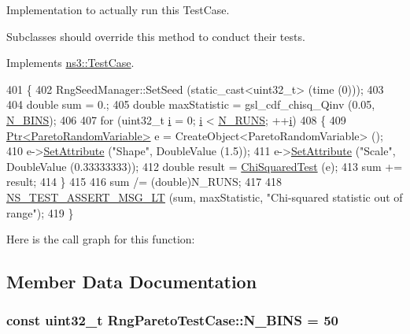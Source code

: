 Implementation to actually run this Test\+Case. 

Subclasses should override this method to conduct their tests. 

Implements \hyperlink{classns3_1_1TestCase_a8ff74680cf017ed42011e4be51917a24}{ns3\+::\+Test\+Case}.


\begin{DoxyCode}
401 \{
402   RngSeedManager::SetSeed (static\_cast<uint32\_t> (time (0)));
403 
404   \textcolor{keywordtype}{double} sum = 0.;
405   \textcolor{keywordtype}{double} maxStatistic = gsl\_cdf\_chisq\_Qinv (0.05, \hyperlink{classRngParetoTestCase_a1f6889d2d2ecb522f62cdf0ddb8a6153}{N\_BINS});
406 
407   \textcolor{keywordflow}{for} (uint32\_t \hyperlink{bernuolliDistribution_8m_a6f6ccfcf58b31cb6412107d9d5281426}{i} = 0; \hyperlink{bernuolliDistribution_8m_a6f6ccfcf58b31cb6412107d9d5281426}{i} < \hyperlink{classRngParetoTestCase_a08aa14adfe517ce6bce686b6a62b9f4b}{N\_RUNS}; ++\hyperlink{bernuolliDistribution_8m_a6f6ccfcf58b31cb6412107d9d5281426}{i})
408     \{
409       \hyperlink{classns3_1_1Ptr}{Ptr<ParetoRandomVariable>} e = CreateObject<ParetoRandomVariable> ();
410       e->\hyperlink{classns3_1_1ObjectBase_ac60245d3ea4123bbc9b1d391f1f6592f}{SetAttribute} (\textcolor{stringliteral}{"Shape"}, DoubleValue (1.5));
411       e->\hyperlink{classns3_1_1ObjectBase_ac60245d3ea4123bbc9b1d391f1f6592f}{SetAttribute} (\textcolor{stringliteral}{"Scale"}, DoubleValue (0.33333333));
412       \textcolor{keywordtype}{double} result = \hyperlink{classRngParetoTestCase_a1b1a890069145d6fa0f9626d094ea57d}{ChiSquaredTest} (e);
413       sum += result;
414     \}
415 
416   sum /= (double)N\_RUNS;
417 
418   \hyperlink{group__testing_ga1d96848b91407c9a0b36583e8b0ad7ae}{NS\_TEST\_ASSERT\_MSG\_LT} (sum, maxStatistic, \textcolor{stringliteral}{"Chi-squared statistic out of range"});
419 \}
\end{DoxyCode}


Here is the call graph for this function\+:




\subsection{Member Data Documentation}
\subsubsection[{\texorpdfstring{N\+\_\+\+B\+I\+NS}{N_BINS}}]{\setlength{\rightskip}{0pt plus 5cm}const uint32\+\_\+t Rng\+Pareto\+Test\+Case\+::\+N\+\_\+\+B\+I\+NS = 50\hspace{0.3cm}{\ttfamily [static]}}\hypertarget{classRngParetoTestCase_a1f6889d2d2ecb522f62cdf0ddb8a6153}{}\label{classRngParetoTestCase_a1f6889d2d2ecb522f62cdf0ddb8a6153}
